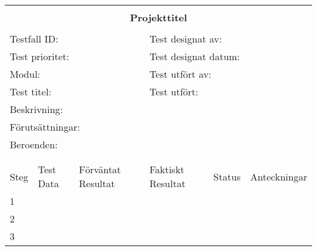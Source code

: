 \documentclass[10pt]{article}
\begin{document}
\begin{tabular}{| p{1cm}|  p{3cm} | p{3cm}| p{3cm}| p{2cm}| p{3cm}|}


	\hline
	\multicolumn{6}{|l|}{}\\
	\multicolumn{6}{|c|}{\huge{\textbf{Projekttitel}}}\\
	\multicolumn{6}{|l|}{}\\
	\hline
	\multicolumn{3}{|l|}{Testfall ID:}&\multicolumn{3}{|l|}{Test designat av:}\\
	\hline
	\multicolumn{3}{|l|}{Test prioritet:}&\multicolumn{3}{|l|}{Test designat datum:}\\
	\hline
	\multicolumn{3}{|l|}{Modul:}&\multicolumn{3}{|l|}{Test utfört av:}\\
	\hline
	\multicolumn{3}{|l|}{Test titel:}&\multicolumn{3}{|l|}{Test utfört:}\\
	\hline
	\multicolumn{3}{|l|}{Beskrivning:}&\multicolumn{3}{|l|}{}\\
	\hline
	\multicolumn{6}{|l|}{Förutsättningar:}\\
	\hline
	\multicolumn{6}{|l|}{Beroenden:}\\
	
	\hline
	\multicolumn{6}{|l|}{}\\
	\multicolumn{6}{|l|}{}\\
      	\hline
	Steg&Test Data&Förväntat Resultat&Faktiskt Resultat&Status&Anteckningar \\
	\hline
	1&&&&&\\
      	\hline
	2&&&&&\\
      	\hline
	3&&&&&\\
      	\hline
\end{tabular}
\end{document}
